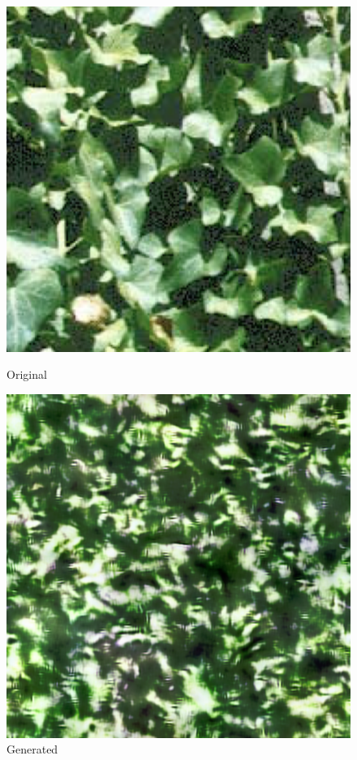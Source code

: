 \documentclass{article}
\begin{document}
    \begin{figure}[!htb]
    \begin{center}
      \includegraphics[scale=.14]{5/report/steerable/4.png}
      \caption{Original}
    \end{center}
    \endminipage \hfill
    \begin{center}
      \includegraphics[scale=.34]{5/report/steerable/4_c.png}
      \caption{Generated}
    \end{center}
    \endminipage
    \end{figure} 
\end{document}
